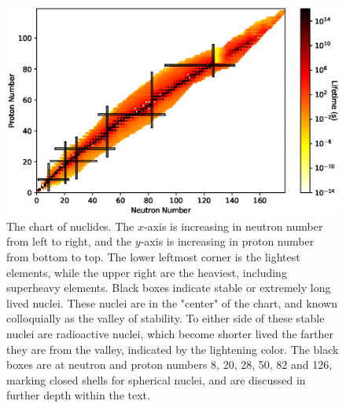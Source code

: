 \begin{figure}
    \centering
    \includegraphics[scale=0.8]{Introduction_Figs/ChartNuclides.eps}
    \caption{The chart of nuclides. The $x$-axis is increasing in neutron number from left to right, and the $y$-axis is increasing in proton number from bottom to top. The lower leftmost corner is the lightest elements, while the upper right are the heaviest, including superheavy elements. Black boxes indicate stable or extremely long lived nuclei. These nuclei are in the "center" of the chart, and known colloquially as the valley of stability. To either side of these stable nuclei are radioactive nuclei, which become shorter lived the farther they are from the valley, indicated by the lightening color. The black boxes are at neutron and proton numbers 8, 20, 28, 50, 82 and 126, marking closed shells for spherical nuclei, and are discussed in further depth within the text.}
    \label{fig:chart}
\end{figure}